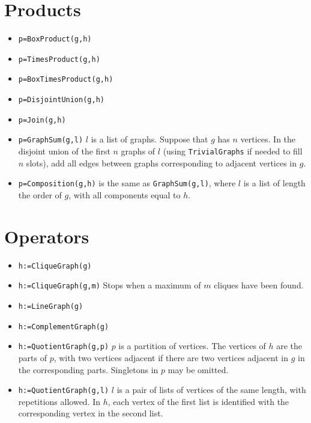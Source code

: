\documentclass[11pt]{article}
\begin{document}
\begin{multicols}{3}
\section{Products}
\label{sec-8}
\begin{itemize}
\item \verb~p=BoxProduct(g,h)~
\item \verb~p=TimesProduct(g,h)~
\item \verb~p=BoxTimesProduct(g,h)~
\item \verb~p=DisjointUnion(g,h)~
\item \verb~p=Join(g,h)~
\item \verb~p=GraphSum(g,l)~ \(l\) is a list of graphs. Suppose that \(g\) has
\(n\) vertices. In the disjoint union of the first \(n\) graphs of
\(l\) (using \verb~TrivialGraphs~ if needed to fill \(n\) slots), add all
edges between graphs corresponding to adjacent vertices in \(g\).
\item \verb~p=Composition(g,h)~ is the same as \verb~GraphSum(g,l)~, where \(l\) is
a list of length the order of \(g\), with all components equal to
\(h\).
\end{itemize}

\section{Operators}
\label{sec-9}

\begin{itemize}
\item \verb~h:=CliqueGraph(g)~
\item \verb~h:=CliqueGraph(g,m)~ Stops when a maximum of
\(m\) cliques have been found.
\item \verb~h:=LineGraph(g)~
\item \verb~h:=ComplementGraph(g)~
\item \verb~h:=QuotientGraph(g,p)~ \(p\) is a partition of vertices. The
vertices of \(h\) are the parts of \(p\), with two vertices adjacent
if there are two vertices adjacent in \(g\) in the corresponding
parts. Singletons in \(p\) may be omitted.
\item \verb~h:=QuotientGraph(g,l)~ \(l\) is a pair of lists of vertices of the
same length, with repetitions allowed. In \(h\), each vertex of the
first list is identified with the corresponding vertex in the second
list.
\end{itemize}


\end{multicols}
\end{document}

